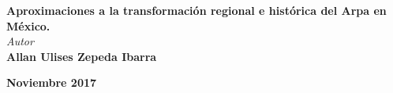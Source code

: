 
\begin{titlepage} %

    \begin{center}

	    \begin{center}

	      {\fontsize{16}{20} \textbf{Aproximaciones a la transformación regional e histórica del Arpa en México.}}\vspace{1cm}\\
	      {\fontsize{14}{20} \textit{Autor}}\\
	      {\fontsize{14}{20} \textbf{Allan Ulises Zepeda Ibarra}}\vspace{2.5cm}\\
	      
	    \end{center}

	    \hfill  \fontsize{14}{20} \textbf{Noviembre 2017}

	    

    \end{center}

\end{titlepage}